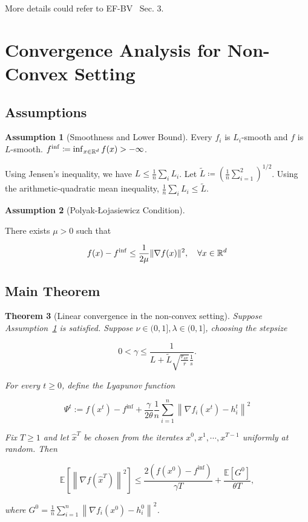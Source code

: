 \documentclass{article} %
\newcommand{\algname}[1]{{\sf\green\relscale{0.90}#1}\xspace}
\newcommand{\eqdef}{\coloneqq}
\theoremstyle{plain}
\newtheorem{theorem}{Theorem}[section]
\theoremstyle{definition}
\newtheorem{assumption}[theorem]{Assumption}
\theoremstyle{remark}
\newcommand{\green}{\color{mydarkgreen}}
\newcommand{\sqnorm}[1]{\left\| #1 \right\|^2}
\begin{document}
More details could refer to \algname{EF-BV}~\cite{condat2022ef} Sec. 3.

\section{Convergence Analysis for Non-Convex Setting}
   \subsection{Assumptions}
   \begin{assumption}[Smoothness and Lower Bound]\label{assump:smooth}
      Every $f_i$ is $L_i$-smooth and $f$ is $L$-smooth. $f^{\inf}\eqdef \inf_{x\in \R^d} f(x) > -\infty$.
   \end{assumption}

   Using Jensen's inequality, we have $L\leq \frac{1}{n}\sum_{i}L_i$. Let $\tilde{L}\eqdef (\frac{1}{n}\sum_{i=1}^2)^{1/2}$. Using the arithmetic-quadratic mean inequality, $\frac{1}{n}\sum_{i}L_i \leq \tilde{L}$.

   \begin{assumption}[Polyak-Łojasiewicz Condition]\label{assump:pl}
      
      There exists $\mu>0$ such that 

      \begin{equation}
         f(x) - f^{\inf} \leq \frac{1}{2\mu} \| \nabla f(x)\|^2, \quad \forall x\in\mathbb{R}^d
      \end{equation}
   \end{assumption}

   \subsection{Main Theorem}
   \begin{theorem}[Linear convergence in the non-convex setting]\label{thm:main}
      Suppose Assumption~\ref{assump:smooth} is satisfied. Suppose $\nu\in (0, 1], \lambda\in (0,1]$, choosing the stepsize 
      
      $$0< \gamma \leq \frac{1}{L + \tilde{L}\sqrt{\frac{r_{\mathrm{av}}}{r}}\frac{1}{s}}.$$

      For every $t\geq 0$, define the Lyapunov function

      \begin{equation}
         \Psi^{t}:=f\left(x^{t}\right)-f^{\inf}+\frac{\gamma}{2 \theta} \frac{1}{n} \sum_{i=1}^{n}\left\|\nabla f_{i}\left(x^{t}\right)-h_{i}^{t}\right\|^{2}
         \end{equation}
      
      Fix $T\geq 1$ and let $\hat{x}^T$ be chosen from the iterates $x^0, x^1, \cdots, x^{T-1}$ uniformly at random. Then 

      \begin{equation}
         \mathbb{E}\left[\left\|\nabla f\left(\hat{x}^{T}\right)\right\|^{2}\right] \leq \frac{2\left(f\left(x^{0}\right)-f^{\inf}\right)}{\gamma T}+\frac{\mathbb{E}\left[G^{0}\right]}{\theta T},
         \end{equation}

      where $G^0=\frac{1}{n}\sum_{i=1}^n \sqnorm{\nabla f_i(x^0) - h_i^0}$.
   \end{theorem}
\end{document}
